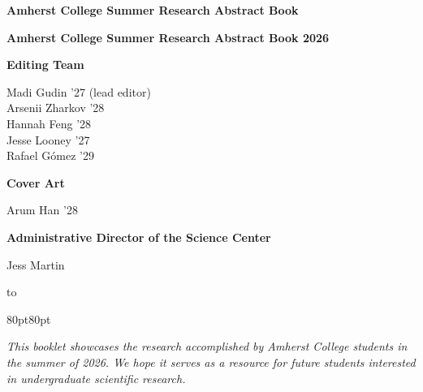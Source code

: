 \documentclass[11pt,twoside]{article} %
\newcommand{\separ}{%
  \hbox to \linewidth{
    \;\textasteriskcentered\qquad\textasteriskcentered\qquad\textasteriskcentered\;
  }
 }
\begin{document}
\pagestyle{empty}



\null
\clearpage

\begin{titlepage}
  \begin{center}
    {\fontsize{40}{100}\selectfont \textbf{Amherst College Summer Research Abstract Book}}
    {\fontsize{30}{0}}
  \end{center}
\end{titlepage}

\null
\clearpage

\begin{center}
  \parskip=2pt

{\LARGE \textbf{Amherst College Summer Research Abstract Book 2026}}

{\large \textbf{Editing Team}}

Madi Gudin '27 (lead editor)\\
Arsenii Zharkov '28\\
Hannah Feng '28\\
Jesse Looney '27\\
Rafael Gómez '29 

\vspace{15pt}
{\large \textbf{Cover Art}}

Arum Han '28

\vspace{15pt}
{\large \textbf{Administrative Director of the Science Center}}

Jess Martin


\begin{center}
  \separ
\end{center}

\begin{adjustwidth*}{80pt}{80pt}
  \begin{center}
    \textit{This booklet showcases the research accomplished by Amherst College students in the summer of 2026. We hope it serves as a resource for future students interested in undergraduate scientific research.}
  \end{center}
\end{adjustwidth*}

\end{center}
\end{document}
